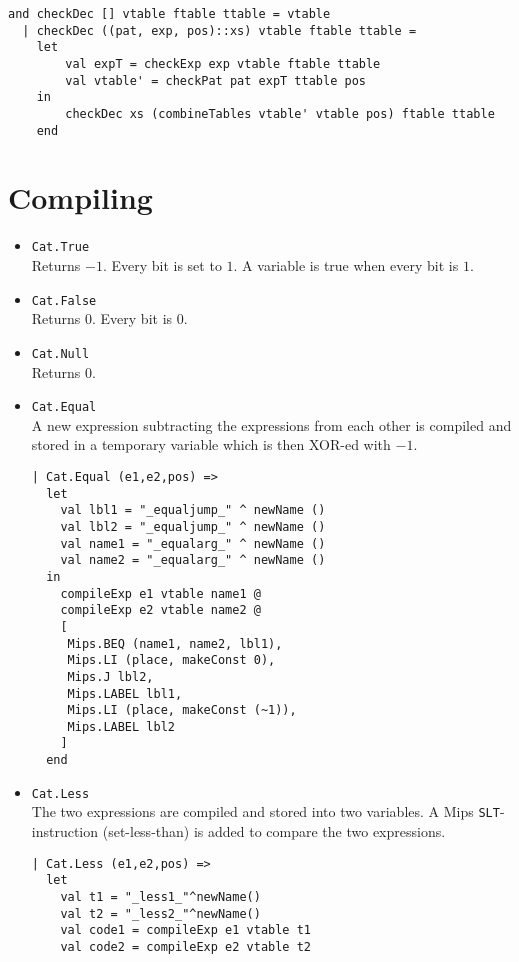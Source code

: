 \documentclass{article}
\begin{document}
\begin{lstlisting}
and checkDec [] vtable ftable ttable = vtable
  | checkDec ((pat, exp, pos)::xs) vtable ftable ttable =
    let
        val expT = checkExp exp vtable ftable ttable
        val vtable' = checkPat pat expT ttable pos
    in
        checkDec xs (combineTables vtable' vtable pos) ftable ttable
    end
\end{lstlisting}

\section{Compiling}
\begin{itemize}
	\item {\tt Cat.True } \\
	Returns $-1$. Every bit is set to $1$. A variable is true when every bit is $1$.
	\item {\tt Cat.False } \\
	Returns $0$. Every bit is $0$. 
	\item {\tt Cat.Null } \\
	Returns $0$.
	\item {\tt Cat.Equal } \\
	A new expression subtracting the expressions from each other is compiled and stored in a temporary variable which is then XOR-ed with $-1$.
	\begin{lstlisting}
| Cat.Equal (e1,e2,pos) =>
  let
    val lbl1 = "_equaljump_" ^ newName ()
    val lbl2 = "_equaljump_" ^ newName ()
    val name1 = "_equalarg_" ^ newName ()
    val name2 = "_equalarg_" ^ newName ()
  in
    compileExp e1 vtable name1 @
    compileExp e2 vtable name2 @
    [
     Mips.BEQ (name1, name2, lbl1),
     Mips.LI (place, makeConst 0),
     Mips.J lbl2,
     Mips.LABEL lbl1,
     Mips.LI (place, makeConst (~1)),
     Mips.LABEL lbl2
    ]
  end
	\end{lstlisting}
	\item {\tt Cat.Less } \\
	The two expressions are compiled and stored into two variables. A Mips {\tt SLT}-instruction (set-less-than) is added to compare the two expressions.
	\begin{lstlisting}
| Cat.Less (e1,e2,pos) =>
  let
    val t1 = "_less1_"^newName()
    val t2 = "_less2_"^newName()
    val code1 = compileExp e1 vtable t1
    val code2 = compileExp e2 vtable t2

\end{lstlisting}
\end{itemize}
\end{document}
